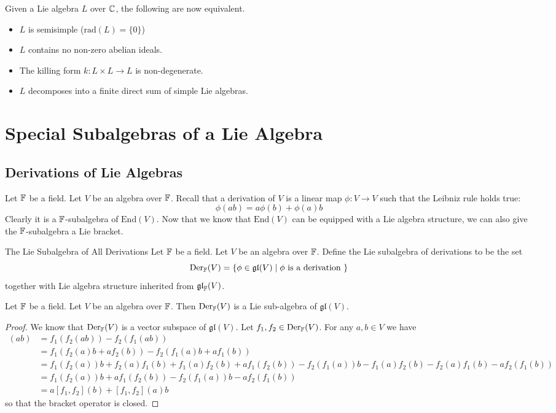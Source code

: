 \documentclass[a4paper]{article}
\begin{document}
Given a Lie algebra $L$ over $\mathbb{C}$, the following are now equivalent. 
\begin{itemize}
\item $L$ is semisimple ($\text{rad}(L)=\{0\}$)
\item $L$ contains no non-zero abelian ideals. 
\item The killing form $k:L\times L\to L$ is non-degenerate. 
\item $L$ decomposes into a finite direct sum of simple Lie algebras. 
\end{itemize}


\pagebreak
\section{Special Subalgebras of a Lie Algebra}
\subsection{Derivations of Lie Algebras}
 Let $\mathbb{F}$ be a field. Let $V$ be an algebra over $\mathbb{F}$. Recall that a derivation of $V$ is a linear map $\phi:V\to V$ such that the Leibniz rule holds true: $$\phi(ab)=a\phi(b)+\phi(a)b$$ Clearly it is a $\mathbb{F}$-subalgebra of $\text{End}(V)$. Now that we know that $\text{End}(V)$ can be equipped with a Lie algebra structure, we can also give the $\mathbb{F}$-subalgebra a Lie bracket. 

\begin{defn}{The Lie Subalgebra of All Derivations}{} Let $\mathbb{F}$ be a field. Let $V$ be an algebra over $\mathbb{F}$. Define the Lie subalgebra of derivations to be the set $$\text{Der}_{\mathbb{F}}(V)=\{\phi\in\mathfrak{gl}(V)\;|\;\phi\text{ is a derivation }\}$$ together with Lie algebra structure inherited from $\mathfrak{gl}_{\mathbb{F}}(V)$. 
\end{defn}

\begin{lmm}{}{} Let $\mathbb{F}$ be a field. Let $V$ be an algebra over $\mathbb{F}$. Then $\text{Der}_{\mathbb{F}}(V)$ is a Lie sub-algebra of $\mathfrak{gl}(V)$. \tcbline
\begin{proof}
We know that $\text{Der}_{\mathbb{F}}(V)$ is a vector subspace of $\mathfrak{gl}(V)$. Let $f_1,f_2\in\text{Der}_{\mathbb{F}}(V)$. For any $a,b\in V$ we have 
\begin{align*}
[f_1,f_2](ab)&=f_1(f_2(ab))-f_2(f_1(ab))\\
&=f_1(f_2(a)b+af_2(b))-f_2(f_1(a)b+af_1(b))\\
&=f_1(f_2(a))b+f_2(a)f_1(b)+f_1(a)f_2(b)+af_1(f_2(b))-f_2(f_1(a))b-f_1(a)f_2(b)-f_2(a)f_1(b)-af_2(f_1(b))\\
&=f_1(f_2(a))b+af_1(f_2(b))-f_2(f_1(a))b-af_2(f_1(b))\\
&=a[f_1,f_2](b)+[f_1,f_2](a)b
\end{align*}
so that the bracket operator is closed. 
\end{proof}
\end{lmm}
\end{document}
